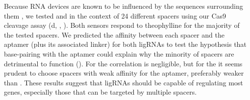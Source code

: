 \documentclass[10pt,oneside]{article}
\begin{document}
% 
% 
% 
% 
% 
%
Because RNA devices are known to be influenced by the sequences surrounding them \autocite{liang2012}, we tested \ligrnaF{} and \ligrnaB{} in the context of 24 different spacers using our \invitro{} Cas9 cleavage assay (d, , ).  Both sensors respond to theophylline for the majority of the tested spacers.  We predicted the affinity between each spacer and the aptamer (plus its associated linker) for both ligRNAs to test the hypothesis that base-pairing with the aptamer could explain why the minority of spacers are detrimental to function ().  For \ligrnaF{} the correlation is negligible, but for the \ligrnaB{} it seems prudent to choose spacers with weak affinity for the aptamer, preferably weaker than .  These results suggest that ligRNAs should be capable of regulating most genes, especially those that can be targeted by multiple spacers.
% 
% 
% 
%
% 
%


\end{document}
